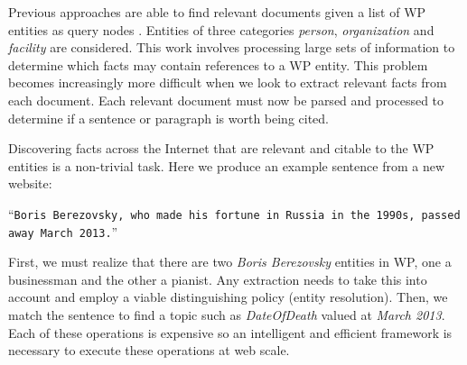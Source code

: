 Previous approaches are able to find relevant documents given a list of WP
entities as query nodes \cite{mcnamee2012hltcoe, dalton2013bi,
Bonnefoy:2013:WDE:2484028.2484180, Balog:2013:CCR:2484028.2484151,ji2011knowledge}.
Entities of three categories \textit{person}, \textit{organization} and \textit{facility} are considered.
This work involves processing large sets of information to determine which facts may contain references to a WP entity. 
This problem becomes increasingly more difficult when we look to extract relevant facts from
each document.
Each relevant document must now be parsed and processed to determine if a sentence or paragraph is worth being cited.

Discovering facts across the Internet that are relevant and citable to the WP entities is a non-trivial task.
Here we produce an example sentence from a new website: 

``{\small \texttt{Boris Berezovsky, who made his fortune in Russia in the 1990s, passed away March 2013.}}''

First, we must realize that there are two \textit{Boris Berezovsky} entities in WP, one a businessman and the other a pianist.
Any extraction needs to take this into account and employ a viable distinguishing policy (entity resolution).
Then, we match the sentence to find a topic such as \textit{DateOfDeath} valued at \textit{March 2013}.
Each of these operations is expensive so an intelligent and efficient framework is necessary to execute these operations at web scale.


